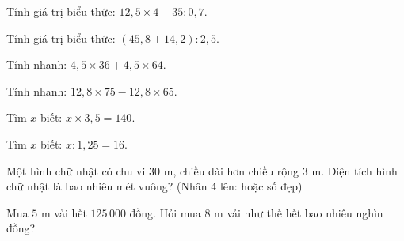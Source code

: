 
\begin{ex}
  Tính giá trị biểu thức: $12{,}5 \times 4 - 35 : 0{,}7$.
\end{ex}

\begin{ex}
  Tính giá trị biểu thức: $(45{,}8 + 14{,}2) : 2{,}5$.
\end{ex}

\begin{ex}
  Tính nhanh: $4{,}5 \times 36 + 4{,}5 \times 64$.
\end{ex}

\begin{ex}
  Tính nhanh: $12{,}8 \times 75 - 12{,}8 \times 65$.
\end{ex}

\begin{ex}
  Tìm $x$ biết: $x \times 3{,}5 = 140$.
\end{ex}

\begin{ex}
  Tìm $x$ biết: $x : 1{,}25 = 16$.
\end{ex}

\begin{ex}
  Một hình chữ nhật có chu vi $30\text{ m}$, chiều dài hơn chiều rộng $3\text{ m}$. Diện tích hình chữ nhật là bao nhiêu mét vuông? (Nhân 4 lên: hoặc số đẹp)
\end{ex}

\begin{ex}
  Mua $5\text{ m}$ vải hết $125\,000$ đồng. Hỏi mua $8\text{ m}$ vải như thế hết bao nhiêu nghìn đồng?
\end{ex}

